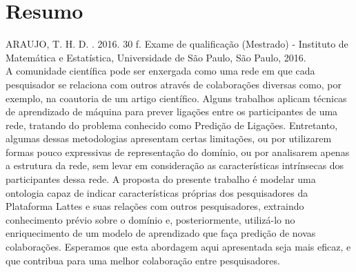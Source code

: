 \documentclass[11pt,twoside,a4paper]{book}
\begin{document}
%
%
%
%


\chapter*{Resumo}

\noindent ARAUJO, T. H. D. \textbf{\mydocumenttitle{}}.
2016. 30 f. Exame de qualificação (Mestrado) - Instituto de Matemática e Estatística,
Universidade de São Paulo, São Paulo, 2016.
\\

A comunidade científica pode ser enxergada como uma rede em que cada pesquisador se relaciona com outros através de colaborações diversas como, por exemplo, na coautoria de um artigo científico. Alguns trabalhos aplicam técnicas de aprendizado de máquina para prever ligações entre os participantes de uma rede, tratando do problema conhecido como Predição de Ligações. Entretanto, algumas dessas metodologias apresentam certas limitações, ou por utilizarem formas pouco expressivas de representação do domínio, ou por analisarem apenas a estrutura da rede, sem levar em consideração as características intrínsecas dos participantes dessa rede. A proposta do presente trabalho é modelar uma ontologia capaz de indicar características próprias dos pesquisadores da Plataforma Lattes e suas relações com outros pesquisadores, extraindo conhecimento prévio sobre o domínio e, posteriormente, utilizá-lo no enriquecimento de um modelo de aprendizado que faça predição de novas colaborações. Esperamos que esta abordagem aqui apresentada seja mais eficaz, e que contribua para uma melhor colaboração entre pesquisadores.
\\
\end{document}
